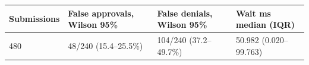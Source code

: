 \begin{tabular}{llll}
\hline
Submissions & False approvals, Wilson 95\% & False denials, Wilson 95\% & Wait ms median (IQR) \\
\hline
480 & 48/240 (15.4--25.5\%) & 104/240 (37.2--49.7\%) & 50.982 (0.020--99.763) \\
\hline
\end{tabular}
